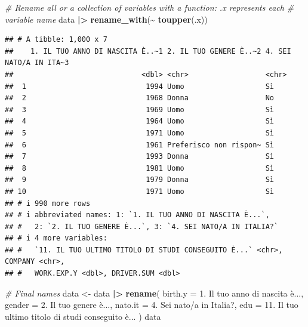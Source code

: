 \documentclass[
]{book}
\newenvironment{Shaded}{\begin{snugshade}}{\end{snugshade}}
\newcommand{\AttributeTok}[1]{\textcolor[rgb]{0.13,0.29,0.53}{#1}}
\newcommand{\CommentTok}[1]{\textcolor[rgb]{0.56,0.35,0.01}{\textit{#1}}}
\newcommand{\FunctionTok}[1]{\textcolor[rgb]{0.13,0.29,0.53}{\textbf{#1}}}
\newcommand{\NormalTok}[1]{#1}
\newcommand{\OtherTok}[1]{\textcolor[rgb]{0.56,0.35,0.01}{#1}}
\newcommand{\SpecialCharTok}[1]{\textcolor[rgb]{0.81,0.36,0.00}{\textbf{#1}}}
\newcommand{\StringTok}[1]{\textcolor[rgb]{0.31,0.60,0.02}{#1}}
\begin{document}
\begin{Shaded}
\begin{Highlighting}[]
\CommentTok{\# Rename all or a collection of variables with a function: .x represents each}
\CommentTok{\# variable name}
\NormalTok{data }\SpecialCharTok{|\textgreater{}} 
  \FunctionTok{rename\_with}\NormalTok{(}\SpecialCharTok{\textasciitilde{}} \FunctionTok{toupper}\NormalTok{(.x))}
\end{Highlighting}
\end{Shaded}

\begin{verbatim}
## # A tibble: 1,000 x 7
##    1. IL TUO ANNO DI NASCITA È..~1 2. IL TUO GENERE È..~2 4. SEI NATO/A IN ITA~3
##                              <dbl> <chr>                  <chr>                 
##  1                            1994 Uomo                   Sì                    
##  2                            1968 Donna                  No                    
##  3                            1969 Uomo                   Sì                    
##  4                            1964 Uomo                   Sì                    
##  5                            1971 Uomo                   Sì                    
##  6                            1961 Preferisco non rispon~ Sì                    
##  7                            1993 Donna                  Sì                    
##  8                            1981 Uomo                   Sì                    
##  9                            1979 Donna                  Sì                    
## 10                            1971 Uomo                   Sì                    
## # i 990 more rows
## # i abbreviated names: 1: `1. IL TUO ANNO DI NASCITA È...`,
## #   2: `2. IL TUO GENERE È...`, 3: `4. SEI NATO/A IN ITALIA?`
## # i 4 more variables:
## #   `11. IL TUO ULTIMO TITOLO DI STUDI CONSEGUITO È...` <chr>, COMPANY <chr>,
## #   WORK.EXP.Y <dbl>, DRIVER.SUM <dbl>
\end{verbatim}

\begin{Shaded}
\begin{Highlighting}[]
\CommentTok{\# Final names }
\NormalTok{data }\OtherTok{\textless{}{-}}\NormalTok{ data }\SpecialCharTok{|\textgreater{}} 
  \FunctionTok{rename}\NormalTok{(}
    \AttributeTok{birth.y =} \StringTok{\textasciigrave{}}\AttributeTok{1. Il tuo anno di nascita è...}\StringTok{\textasciigrave{}}\NormalTok{,}
    \AttributeTok{gender =} \StringTok{\textasciigrave{}}\AttributeTok{2. Il tuo genere è...}\StringTok{\textasciigrave{}}\NormalTok{,}
    \AttributeTok{nato.it =} \StringTok{\textasciigrave{}}\AttributeTok{4. Sei nato/a in Italia?}\StringTok{\textasciigrave{}}\NormalTok{,}
    \AttributeTok{edu =} \StringTok{\textasciigrave{}}\AttributeTok{11. Il tuo ultimo titolo di studi conseguito è...}\StringTok{\textasciigrave{}}
\NormalTok{  )}
\NormalTok{data}
\end{Highlighting}
\end{Shaded}
\end{document}
